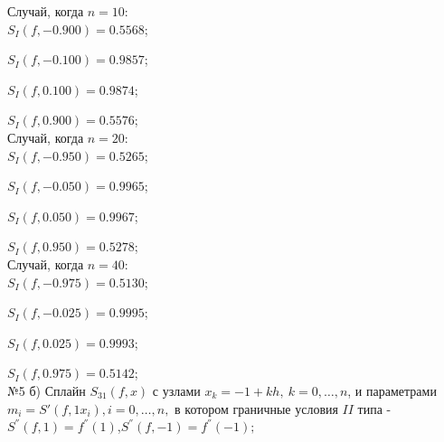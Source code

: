 \documentclass[rus, 12 pt]{article}
\begin{document}
    
    

    
    Случай, когда $n=10$:\\

    
    

    
    $S_{I}(f,-0.900)=0.5568$;

    
    $S_{I}(f,-0.100)=0.9857$;

    
    $S_{I}(f,0.100)=0.9874$;

    
    $S_{I}(f,0.900)=0.5576$;\\

    
    

    
    Случай, когда $n=20$:\\

    
    

    
    $S_{I}(f,-0.950)=0.5265$;

    
    $S_{I}(f,-0.050)=0.9965$;

    
    $S_{I}(f,0.050)=0.9967$;

    
    $S_{I}(f,0.950)=0.5278$;\\

    
    

    
    Случай, когда $n=40$:\\

    
    

    
    $S_{I}(f,-0.975)=0.5130$;

    
    $S_{I}(f,-0.025)=0.9995$;

    
    $S_{I}(f,0.025)=0.9993$;

    
    $S_{I}(f,0.975)=0.5142$;\\

    
    

    
    №5 б) Сплайн \(S_{31}(f,x)\) с узлами \(x_k=-1+kh,\:k=0,\ldots,n\), и
параметрами \(m_i=S'(f,1x_i),i=0,\ldots,n,\) в котором граничные условия
\(II\) типа - \(S^{''}(f,1)=f^{''}(1)\),\(S^{''}(f,-1)=f^{''}(-1);\)
\end{document}
